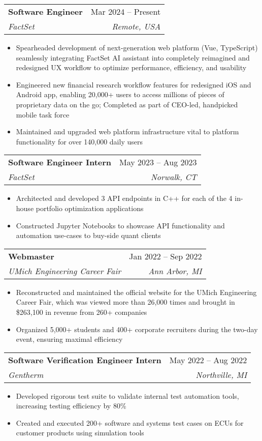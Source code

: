 \documentclass[letterpaper,11pt]{article}
\makeatletter
\newcommand{\resumeItem}[1]{
  \item\small{
    {#1 \vspace{-2pt}}
  }
}
\newcommand{\resumeSubheading}[4]{
  \vspace{-2pt}\item
    \begin{tabular*}{0.97\textwidth}[t]{l@{\extracolsep{\fill}}r}
      \textbf{#1} & #2 \\
      \textit{\small#3} & \textit{\small #4} \\
    \end{tabular*}\vspace{-7pt}
}
\newcommand{\resumeSubSubheading}[2]{
    \item
    \begin{tabular*}{0.97\textwidth}{l@{\extracolsep{\fill}}r}
      \textit{\small#1} & \textit{\small #2} \\
    \end{tabular*}\vspace{-7pt}
}
\newcommand{\resumeSubHeadingListEnd}{\end{itemize}}
\newcommand{\resumeItemListStart}{\begin{itemize}}
\newcommand{\resumeItemListEnd}{\end{itemize}\vspace{-5pt}}
\makeatother
\begin{document}
    \resumeSubheading
      {Software Engineer}{Mar 2024 -- Present}
      {FactSet}{Remote, USA}
      \resumeItemListStart
        \resumeItem{Spearheaded development of next-generation web platform (Vue, TypeScript) seamlessly integrating FactSet AI assistant into completely reimagined and redesigned UX workflow to optimize performance, efficiency, and usability}
        \resumeItem{Engineered new financial research workflow features for redesigned iOS and Android app, enabling 20,000+ users to access millions of pieces of proprietary data on the go; Completed as part of CEO-led, handpicked mobile task force}
        \resumeItem{Maintained and upgraded web platform infrastructure vital to platform functionality for over 140,000 daily users}
      \resumeItemListEnd
      

    \resumeSubheading
      {Software Engineer Intern}{May 2023 -- Aug 2023}
      {FactSet}{Norwalk, CT}
      \resumeItemListStart
        \resumeItem{Architected and developed 3 API endpoints in C++ for each of the 4 in-house portfolio optimization applications}
        \resumeItem{Constructed Jupyter Notebooks to showcase API functionality and automation use-cases to buy-side quant clients}
      \resumeItemListEnd

    \resumeSubheading
      {Webmaster}{Jan 2022 -- Sep 2022}
      {UMich Engineering Career Fair}{Ann Arbor, MI}
      \resumeItemListStart
        \resumeItem{Reconstructed and maintained the official website for the UMich Engineering Career Fair, which was viewed more than 26,000 times and brought in \$263,100 in revenue from 260+ companies}
        \resumeItem{Organized 5,000+ students and 400+ corporate recruiters during the two-day event, ensuring maximal efficiency}
        \resumeItemListEnd

    \resumeSubheading
      {Software Verification Engineer Intern}{May 2022 -- Aug 2022}
      {Gentherm}{Northville, MI}
      \resumeItemListStart
        \resumeItem{Developed rigorous test suite to validate internal test automation tools, increasing testing efficiency by 80\%}
        \resumeItem{Created and executed 200+ software and systems test cases on ECUs for customer products using simulation tools}
        \resumeItemListEnd
\end{document}
